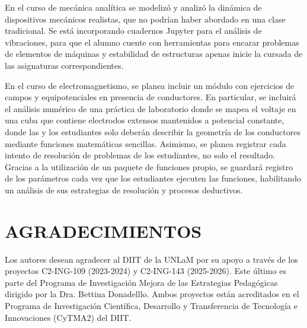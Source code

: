 \documentclass[a4paper]{fodami}        %
\begin{document}
En el curso de mecánica analítica se modelizó y analizó la dinámica de dispositivos mecánicos realistas, que no podrían haber abordado en una clase tradicional.
Se está incorporando cuadernos Jupyter para el análisis de vibraciones, para que el alumno cuente con herramientas para encarar problemas de elementos de máquinas y estabilidad de estructuras apenas inicie la cursada de las asignaturas correspondientes.

En el curso de electromagnetismo, se planea incluir un módulo con ejercicios de campos y equipotenciales en presencia de conductores.
En particular, se incluirá el análisis numérico de una práctica de laboratorio donde se mapea el voltaje en una cuba que contiene electrodos extensos mantenidos a potencial constante, donde las y los estudiantes solo deberán describir la geometría de los conductores mediante funciones matemáticas sencillas.
Asimismo, se planea registrar cada intento de resolución de problemas de los estudiantes, no solo el resultado.
Gracias a la utilización de un paquete de funciones propio, se guardará registro de los parámetros cada vez que los estudiantes ejecuten las funciones, habilitando un análisis de sus estrategias de resolución y procesos deductivos.

\section{AGRADECIMIENTOS}

Los autores desean agradecer al DIIT de la UNLaM por su apoyo a través de los proyectos C2-ING-109 (2023-2024) y C2-ING-143 (2025-2026).
Este último es parte del Programa de Investigación Mejora de las Estrategias Pedagógicas dirigido por la Dra. Bettina Donadelllo.
Ambos proyectos están acreditados en el Programa de Investigación Científica, Desarrollo y Transferencia de Tecnología e Innovaciones (CyTMA2) del DIIT.


\end{document}
